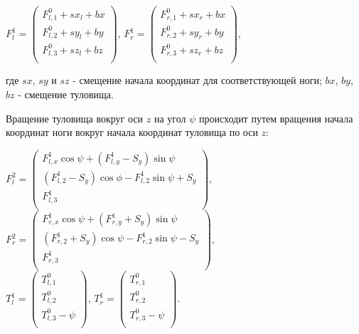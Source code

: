 \begin{center}
$F^{1}_{l} = \begin{pmatrix}
F^{0}_{l,1} + sx_l + bx \\
F^{0}_{l,2} + sy_l + by \\
F^{0}_{l,3} + sz_l + bz \\
\end{pmatrix}$, $F^{1}_{r} = \begin{pmatrix}
F^{0}_{r,1} + sx_r + bx \\
F^{0}_{r,2} + sy_r + by \\
F^{0}_{r,3} + sz_r + bz \\
\end{pmatrix}$,
\end{center}

\noindent где $sx$, $sy$ и $sz$ - смещение начала координат для соответствующей ноги; $bx$, $by$, $bz$ - смещение туловища.

Вращение туловища вокруг оси $z$ на угол $\psi$ происходит путем вращения начала координат ноги вокруг начала координат туловища по оси $z$:

\begin{center}
$F^{2}_{l} = \begin{pmatrix}
F^{1}_{l,x} \cos \psi +( F^{1}_{l,y} - S_{y}) \sin \psi \\
(F^{1}_{l,2} - S_{y}) \cos \phi - F^{1}_{l,2} \sin \psi + S_{y} \\
F^{1}_{l,3} \\
\end{pmatrix}$, $F^{2}_{r} = \begin{pmatrix}
F^{1}_{r,x} \cos \psi +( F^{1}_{r,y} + S_{y}) \sin \psi \\
(F^{1}_{r,2} + S_{y}) \cos \psi - F^{1}_{r,2} \sin \psi - S_{y} \\
F^{1}_{r,3} \\
\end{pmatrix}$,\\
$T^{1}_{l} = \begin{pmatrix}
T^{0}_{l,1} \\
T^{0}_{l,2} \\
T^{0}_{l,3} - \psi \\
\end{pmatrix}$,
$T^{1}_{r} = \begin{pmatrix}
T^{0}_{r,1} \\
T^{0}_{r,2} \\
T^{0}_{r,3} - \psi \\
\end{pmatrix}$.
\end{center}


